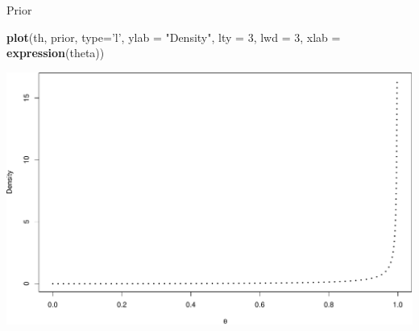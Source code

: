 \documentclass[
  ignorenonframetext,
]{beamer}
\newenvironment{Shaded}{\begin{snugshade}}{\end{snugshade}}
\newcommand{\DataTypeTok}[1]{\textcolor[rgb]{0.13,0.29,0.53}{#1}}
\newcommand{\DecValTok}[1]{\textcolor[rgb]{0.00,0.00,0.81}{#1}}
\newcommand{\KeywordTok}[1]{\textcolor[rgb]{0.13,0.29,0.53}{\textbf{#1}}}
\newcommand{\NormalTok}[1]{#1}
\newcommand{\StringTok}[1]{\textcolor[rgb]{0.31,0.60,0.02}{#1}}
\begin{document}
\begin{frame}[fragile]{Prior}
\protect\hypertarget{prior}{}

\begin{Shaded}
\begin{Highlighting}[]
\KeywordTok{plot}\NormalTok{(th, prior, }\DataTypeTok{type=}\StringTok{'l'}\NormalTok{, }\DataTypeTok{ylab =} \StringTok{"Density"}\NormalTok{, }
     \DataTypeTok{lty =} \DecValTok{3}\NormalTok{, }\DataTypeTok{lwd =} \DecValTok{3}\NormalTok{, }\DataTypeTok{xlab =} \KeywordTok{expression}\NormalTok{(theta))}
\end{Highlighting}
\end{Shaded}

\includegraphics{01-intro-to-Bayes_files/figure-beamer/unnamed-chunk-3-1.pdf}

\end{frame}
\end{document}
